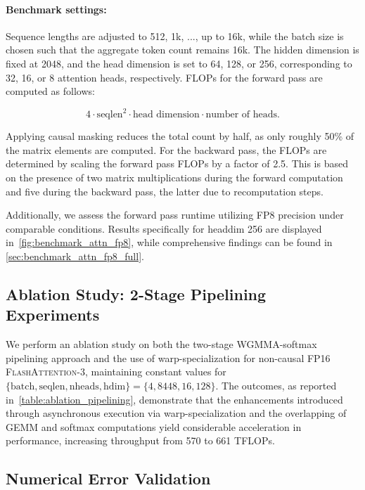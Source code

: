 \begin{algorithm}[H]
\begin{algorithmic}[1]
\begin{enumerate}
\begin{itemize}
\paragraph{Benchmark settings:} Sequence lengths are adjusted to 512, 1k, ..., up to 16k, while the batch size is chosen such that the aggregate token count remains 16k. The hidden dimension is fixed at 2048, and the head dimension is set to 64, 128, or 256, corresponding to 32, 16, or 8 attention heads, respectively. FLOPs for the forward pass are computed as follows:

\begin{equation*}
  4 \cdot \text{seqlen}^2 \cdot \text{head dimension} \cdot \text{number of heads}.
\end{equation*}

Applying causal masking reduces the total count by half, as only roughly 50\% of the matrix elements are computed. For the backward pass, the FLOPs are determined by scaling the forward pass FLOPs by a factor of 2.5. This is based on the presence of two matrix multiplications during the forward computation and five during the backward pass, the latter due to recomputation steps.

Additionally, we assess the forward pass runtime utilizing FP8 precision under comparable conditions. Results specifically for headdim 256 are displayed in~\cref{fig:benchmark_attn_fp8}, while comprehensive findings can be found in \cref{sec:benchmark_attn_fp8_full}.

\subsection{Ablation Study: 2-Stage Pipelining Experiments}
\label{sec:2-stage-pipelining-experiments}

We perform an ablation study on both the two-stage WGMMA-softmax pipelining approach and the use of warp-specialization for non-causal FP16 \textsc{FlashAttention-3}, maintaining constant values for $\{\text{batch}, \text{seqlen}, \text{nheads}, \text{hdim}\} = \{ 4, 8448, 16, 128\}$. The outcomes, as reported in~\cref{table:ablation_pipelining}, demonstrate that the enhancements introduced through asynchronous execution via warp-specialization and the overlapping of GEMM and softmax computations yield considerable acceleration in performance, increasing throughput from 570 to 661 TFLOPs.

\subsection{Numerical Error Validation}
\label{sec:numerical_error}


\end{itemize}
\end{enumerate}
\end{algorithmic}
\end{algorithm}
